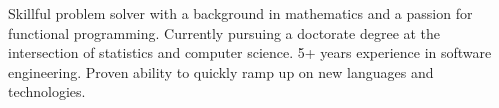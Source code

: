 

\begin{cvparagraph}

Skillful problem solver with a background in mathematics and a passion for
  functional programming.  Currently pursuing a doctorate degree at the
  intersection of statistics and computer science. 5+ years experience in
  software engineering.  Proven ability to quickly ramp up on new
  languages and technologies.
\end{cvparagraph}
